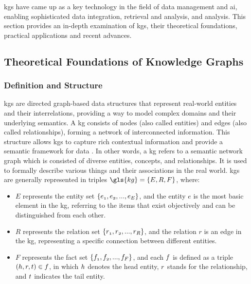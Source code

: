 \glspl{kg} have came up as a key technology in the field of data management and \gls{ai}, enabling sophisticated data integration, retrieval and analysis, and analysis.
This section provides an in-depth examination of \glspl{kg}, their theoretical foundations, practical applications and recent advances.

\subsection*{Theoretical Foundations of Knowledge Graphs}
\subsubsection*{Definition and Structure}
\glspl{kg} are directed graph-based data structures that represent real-world entities and their interrelations, providing a way to model complex domains and their underlying semantics.
A \gls{kg} consists of nodes (also called entities) and edges (also called relationships), forming a network of interconnected information.
This structure allows \glspl{kg} to capture rich contextual information and provide a semantic framework for data \cite{Hogan2021}.
In other words, a \gls{kg} refers to a semantic network graph which is consisted of diverse entities, concepts, and relationships.
It is used to formally describe various things and their associations in the real world.
\glspl{kg} are generally represented in triples $\gls{kg}=\{\mathnormal{E,R,F}\}$, where:
\begin{itemize}
    \item $E$ represents the entity set $\{\mathnormal{e_1, e_2, ... ,e_E} \}$, and the entity $e$ is the most basic element in the \gls{kg}, referring to the items that exist objectively and can be distinguished from each other.
    \item $R$ represents the relation set $\{\mathnormal{r_1, r_2, ... ,r_R}\}$, and the relation $r$ is an edge in the \gls{kg}, representing a specific connection between different entities.
    \item $F$ represents the fact set $\{\mathnormal{f_1,f_2, ... ,f_F}\}$, and each $\mathnormal{f}$ is defined as a triple $(\mathnormal{h,r,t}) \in \mathnormal{f}$, in which $\mathnormal{h}$ denotes the head entity, $\mathnormal{r}$ stands for the relationship, and $\mathnormal{t}$ indicates the tail entity.
\end{itemize}

